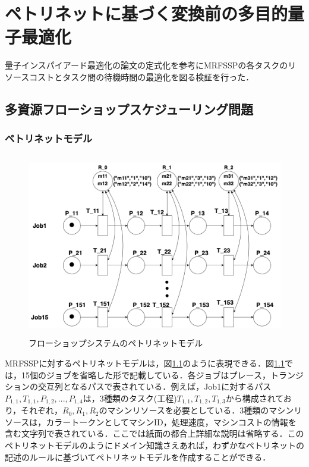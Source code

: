 \chapter{ペトリネットに基づく変換前の多目的量子最適化}
\label{chap:poordirection}
量子インスパイアード最適化の論文\cite{shinjo}の定式化を参考にMRFSSPの各タスクのリソースコストとタスク間の待機時間の最適化を図る検証を行った．
\section{多資源フローショップスケジューリング問題}

\subsection{ペトリネットモデル}

\begin{figure}[H]
    \centering
    \includegraphics[width=0.8\linewidth, height=8cm]{./images/fsp.png}
    \caption{フローショップシステムのペトリネットモデル}
    \label{fig:fig1}
\end{figure}

MRFSSPに対するペトリネットモデルは，図\ref{fig:fig1}のように表現できる．図\ref{fig:fig1}では，15個のジョブを省略した形で記載している．各ジョブはプレース，トランジションの交互列となるパスで表されている．例えば，Job1に対するパス$P_{1,1}, T_{1,1}, P_{1,2}, ..., P_{1,4}$は，3種類のタスク(工程)$T_{1,1}, T_{1,2}, T_{1,3}$から構成されており，それぞれ，$R_0, R_1, R_2$のマシンリソースを必要としている．3種類のマシンリソースは，カラートークンとしてマシンID，処理速度，マシンコストの情報を含む文字列で表されている．ここでは紙面の都合上詳細な説明は省略する．このペトリネットモデルのようにドメイン知識さえあれば，わずかなペトリネットの記述のルールに基づいてペトリネットモデルを作成することができる．

